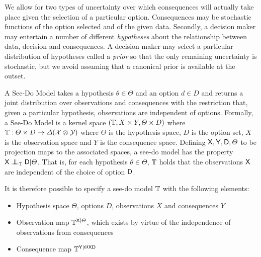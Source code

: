 We allow for two types of uncertainty over which consequences will actually take place given the selection of a particular option. Consequences may be stochastic functions of the option selected and of the given data. Secondly, a decision maker may entertain a number of different \emph{hypotheses} about the relationship between data, decision and consequences. A decision maker may select a particular distribution of hypotheses called a \emph{prior} so that the only remaining uncertainty is stochastic, but we avoid assuming that a canonical prior is available at the outset.

\begin{definition}
A See-Do Model takes a hypothesis $\theta\in \Theta$ and an option $d\in D$ and returns a joint distribution over observations and consequences with the restriction that, given a particular hypothesis, observations are independent of options. Formally, a See-Do Model is a kernel space $(\mathbb{T},X\times Y, \Theta\times D)$ where $\mathbb{T}:\Theta\times D\to \Delta(\mathcal{X}\otimes\mathcal{Y})$ where $\Theta$ is the hypothesis space, $D$ is the option set, $X$ is the observation space and $Y$ is the consequence space. Defining $\mathsf{X},\mathsf{Y},\mathsf{D},\Theta$ to be projection maps to the associated spaces, a see-do model has the property $\RV{X}\CI_{\kernel{T}} \RV{D}|\Theta$. That is, for each hypothesis $\theta\in \Theta$, $\mathbb{T}$ holds that the observations $\mathsf{X}$ are independent of the choice of option $\mathsf{D}$.

It is therefore possible to specify a see-do model $\mathbb{T}$ with the following elements:
\begin{itemize}
    \item Hypothesis space $\Theta$, options $D$, observations $X$ and consequences $Y$
    \item Observation map $\mathbb{T}^{\mathsf{X}|\Theta}$, which exists by virtue of the independence of observations from consequences
    \item Consequence map $\mathbb{T}^{\mathsf{Y}|\Theta\mathsf{X}\mathsf{D}}$
\end{itemize}
\end{definition}

